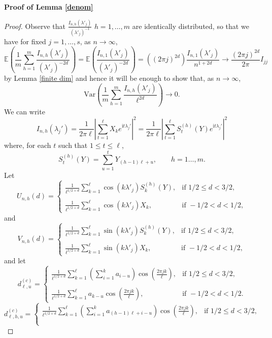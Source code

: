 \documentclass[12pt]{article}
\def\i{\mathrm{i}}
\begin{document}
{\bf Proof of Lemma \ref{denom}} \begin{proof}
Observe that $\frac{I_{n,h}(\lambda'_j)}{(\lambda'_j)^{-1}}$
$h=1,\ldots,m$ are identically distributed, so that we have for fixed $j=1,\ldots,s$, as $n\to\infty$, 
$$
\mathbb{E}\left(\frac{1}{m}\sum_{h=1}^m\frac{I_{n,h}(\lambda'_j)}{(\lambda'_j)^{-2d}}\right)=\mathbb{E}\left(\frac{I_{n,1}(\lambda'_j)}{(\lambda'_j)^{-2d}}\right)=\left((2\pi j)^{2d}\right)\frac{I_{n,1}(\lambda'_j)}{n^{1+2d}}\to\frac{(2\pi j)^{2d}}{2\pi}I_{jj}
$$
by Lemma \ref{finite dim} and hence it will be enough to show that, as $n\to\infty$,
\begin{equation}\label{lim-var}
    \textrm{Var}\left(\frac{1}{m}\sum_{h=1}^m\frac{I_{n,h}(\lambda'_j)}{\ell^{2d}}\right)\to0.
\end{equation}
We can write
 $$
I_{n,h}(\lambda_j')=\frac{1}{2\pi \ell}\left\vert\sum_{t=1}^{\ell}X_ke^{\i t\lambda_j'}\right\vert^2=\frac{1}{2\pi \ell}\left\vert\sum_{t=1}^{\ell}S_t^{(h)}(Y)e^{\i t\lambda_j'}\right\vert^2
 $$
 where, for each $t$ such that  $1\le t\le \ell$,
 $$
 S_t^{(h)}(Y)=\sum_{u=1}^tY_{(h-1)\ell+u},\qquad h=1\ldots,m.
 $$
Let 
$$
U_{n,h}(d)=\begin{cases}
    \frac{1}{\ell^{1/2+d}}\displaystyle\sum_{k=1}^\ell\cos(k\lambda'_j)S_k^{(h)}(Y),&\textrm{if }1/2\le d<3/2,\\\\
    \frac{1}{\ell^{1/2+d}}\displaystyle\sum_{k=1}^\ell\cos(k\lambda'_j)X_k,&\textrm{if }-1/2< d<1/2,
\end{cases}
$$
and
$$
V_{n,h}(d)=\begin{cases}
    \frac{1}{\ell^{1/2+d}}\displaystyle\sum_{k=1}^\ell\sin(k\lambda'_j)S_k^{(h)}(Y),&\textrm{if }1/2\le d<3/2,\\\\
    \frac{1}{\ell^{1/2+d}}\displaystyle\sum_{k=1}^\ell\sin(k\lambda'_j) X_k,&\textrm{if }-1/2< d<1/2,
\end{cases}
$$
and let
$$
d_{\ell,u}^{(c)}=\begin{cases}
\frac{1}{\ell^{1/2+d}}\displaystyle\sum_{k=1}^\ell\left(\sum_{i=1}^ka_{i-u}\right)\cos\left(\frac{2\pi jk}{\ell}\right),&\textrm{if }1/2\le d<3/2,\\\\   
\frac{1}{\ell^{1/2+d}}\displaystyle\sum_{k=1}^\ell a_{k-u}\cos\left(\frac{2\pi jk}{\ell}\right),&\textrm{if }-1/2<d<1/2.
\end{cases}
$$
$$
d_{\ell,h,u}^{(c)}=\begin{cases}
\frac{1}{\ell^{1/2+d}}\displaystyle\sum_{k=1}^\ell\left(\sum_{i=1}^ka_{(h-1)\ell+i-u}\right)\cos\left(\frac{2\pi jk}{\ell}\right),&\textrm{if }1/2\le d<3/2,\\\\ 

\end{cases}$$
\end{proof}
\end{document}
